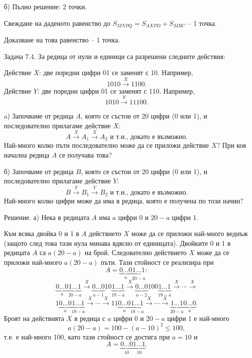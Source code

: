 б) Пълно решение: 2 точки.

Свеждане на даденото равенство до $S_{MNPQ}=S_{AXPD}+S_{MBC}$ – 1 точка.

Доказване на това равенство – 1 точка.

Задача 7.4. За редица от нули и единици са разрешени следните действия:

Действие $X$: две поредни цифри 01 се заменят с 10. Например,
$$
1010\xrightarrow{X}1100.
$$
Действие $Y$: две поредни цифри 01 се заменят с 110. Например,
$$
1010\xrightarrow{Y}11100.
$$

a) Започваме от редица $A$, която се състои от 20 цифри (0 или 1), и последователно прилагаме действие $X$:
$$
A\xrightarrow{X}A_1\xrightarrow{X}A_2\text{ и т.н., докато е възможно.}
$$
Най-много колко пъти последователно може да се приложи действие $X$? При коя начална редица $A$ се получава това?

б) Започваме от редица $B$, която се състои от 20 цифри (0 или 1), и последователно прилагаме действие $Y$:
$$
B\xrightarrow{Y}B_1\xrightarrow{Y}B_2\text{ и т.н., докато е възможно.}
$$
Най-много колко цифри може да има в редица, която е получена по този начин?

Решение. а) Нека в редицата $A$ има $a$ цифри 0 и $20-a$ цифри 1.

Към всяка двойка 0 и 1 в $A$ действието $X$ може да се приложи най-много веднъж (защото след това тази нула минава вдясно от единицата). Двойките 0 и 1 в редицата $A$ са $a(20-a)$ на брой. Следователно действието $X$ може да се приложи най-много $a(20-a)$ пъти. Тази стойност се реализира при
$$
A=\underbrace{0\ldots0}_{a}\underbrace{1\ldots1}_{20-a}:
$$
$$
\underbrace{0\ldots0}_{a}\underbrace{1\ldots1}_{20-a}\xrightarrow{X}\underbrace{0\ldots0}_{a-1}10\underbrace{1\ldots1}_{19-a}\xrightarrow{X}\underbrace{0\ldots0}_{a-2}100\underbrace{1\ldots1}_{19-a}\xrightarrow{X}\cdots\xrightarrow{X}
$$
$$
1\underbrace{0\ldots0}_{a}\underbrace{1\ldots1}_{19-a}\xrightarrow{X}\cdots\xrightarrow{X}11\underbrace{0\ldots0}_{a}\underbrace{1\ldots1}_{18-a}\xrightarrow{X}\cdots\xrightarrow{X}\underbrace{1\ldots1}_{20-a}\underbrace{0\ldots0}_{a}.
$$
Броят на действията $X$ в редица с $a$ цифри 0 и $20-a$ цифри 1 е най-много
$$
a(20-a)=100-(a-10)^2\leq100,
$$
т.е. е най-много 100, като тази стойност се достига при $a=10$ и
$$
A=\underbrace{0\ldots0}_{10}\underbrace{1\ldots1}_{10}.
$$

